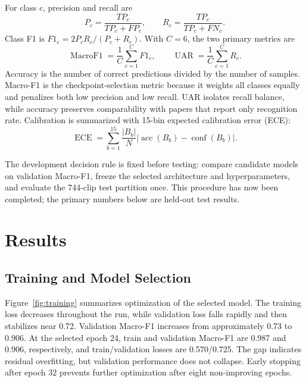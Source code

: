 \documentclass[conference]{IEEEtran}
\begin{document}
For class $c$, precision and recall are
\begin{equation}
 P_c=\frac{TP_c}{TP_c+FP_c}, \qquad
 R_c=\frac{TP_c}{TP_c+FN_c}.
\end{equation}
Class F1 is $F1_c=2P_cR_c/(P_c+R_c)$. With $C=6$, the two primary metrics are
\begin{equation}
 \operatorname{MacroF1}=\frac{1}{C}\sum_{c=1}^{C}F1_c,
 \qquad
 \operatorname{UAR}=\frac{1}{C}\sum_{c=1}^{C}R_c.
\end{equation}
Accuracy is the number of correct predictions divided by the number of
samples. Macro-F1 is the checkpoint-selection metric because it weights all
classes equally and penalizes both low precision and low recall. UAR isolates
recall balance, while accuracy preserves comparability with papers that report
only recognition rate. Calibration is summarized with 15-bin expected
calibration error (ECE):
\begin{equation}
  \operatorname{ECE}=\sum_{b=1}^{15}\frac{|B_b|}{N}
  \left|\operatorname{acc}(B_b)-\operatorname{conf}(B_b)\right|.
\end{equation}

The development decision rule is fixed before testing: compare candidate
models on validation Macro-F1, freeze the selected architecture and
hyperparameters, and evaluate the 744-clip test partition once. This procedure
has now been completed; the primary numbers below are held-out test results.

\section{Results}
\label{sec:results}

\subsection{Training and Model Selection}

Figure~\ref{fig:training} summarizes optimization of the selected model. The
training loss decreases throughout the run, while validation loss falls
rapidly and then stabilizes near 0.72. Validation Macro-F1 increases from
approximately 0.73 to 0.906. At the selected epoch 24, train and validation
Macro-F1 are 0.987 and 0.906, respectively, and train/validation losses are
0.570/0.725. The gap indicates residual overfitting, but validation performance
does not collapse. Early stopping after epoch 32 prevents further optimization
after eight non-improving epochs.
\end{document}
